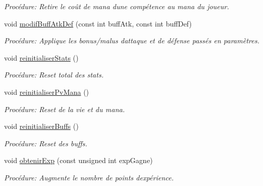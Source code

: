 \begin{DoxyCompactItemize}
\begin{DoxyCompactList}\small\item\em Procédure\+: Retire le coût de mana d\textquotesingle{}une compétence au mana du joueur. \end{DoxyCompactList}\item 
void \mbox{\hyperlink{classJoueur_a1a79c264f3320b2c27d0e2bf3801467a}{modif\+Buff\+Atk\+Def}} (const int buff\+Atk, const int buff\+Def)
\begin{DoxyCompactList}\small\item\em Procédure\+: Applique les bonus/malus d\textquotesingle{}attaque et de défense passés en paramètres. \end{DoxyCompactList}\item 
\mbox{\label{classJoueur_a6d0488ad02ff712b56aab381ac3c64db}} 
void \mbox{\hyperlink{classJoueur_a6d0488ad02ff712b56aab381ac3c64db}{reinitialiser\+Stats}} ()
\begin{DoxyCompactList}\small\item\em Procédure\+: Reset total des stats. \end{DoxyCompactList}\item 
\mbox{\label{classJoueur_a4be9a42bab60bb359df351373ea8fdd2}} 
void \mbox{\hyperlink{classJoueur_a4be9a42bab60bb359df351373ea8fdd2}{reinitialiser\+Pv\+Mana}} ()
\begin{DoxyCompactList}\small\item\em Procédure\+: Reset de la vie et du mana. \end{DoxyCompactList}\item 
\mbox{\label{classJoueur_aa89a0304bf3ec5c70f98d3db312a2d06}} 
void \mbox{\hyperlink{classJoueur_aa89a0304bf3ec5c70f98d3db312a2d06}{reinitialiser\+Buffs}} ()
\begin{DoxyCompactList}\small\item\em Procédure\+: Reset des buffs. \end{DoxyCompactList}\item 
void \mbox{\hyperlink{classJoueur_ab7540c58e8bed028c142426179c597b7}{obtenir\+Exp}} (const unsigned int exp\+Gagne)
\begin{DoxyCompactList}\small\item\em Procédure\+: Augmente le nombre de points d\textquotesingle{}expérience. \end{DoxyCompactList}\item 

\end{DoxyCompactItemize}
